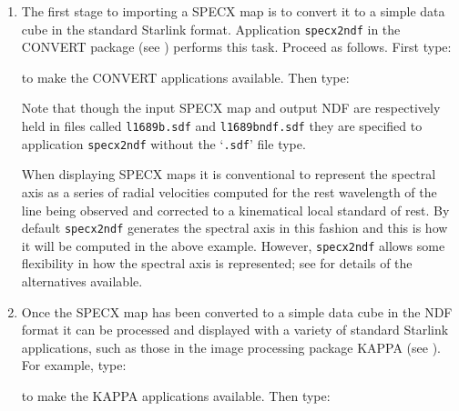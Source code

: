 \documentclass[twoside,11pt]{starlink}
\begin{document}
\begin{enumerate}

  \item The first stage to importing a SPECX map is to convert it to a
   simple data cube in the standard Starlink 
   format.  Application \texttt{specx2ndf} in the CONVERT package
   (see \cite{SUN55}) performs this task.
   Proceed as follows.  First type:

\begin{terminalv}
\end{terminalv}

   to make the CONVERT applications available.  Then type:

\begin{terminalv}
\end{terminalv}

   Note that though the input SPECX map and output NDF are respectively
   held in files called \texttt{l1689b.sdf} and \texttt{l1689bndf.sdf}
   they are specified to application \texttt{specx2ndf} without the `\texttt{.sdf}' file type.

   When displaying SPECX maps it is conventional to represent the
   spectral axis as a series of radial velocities computed for the
   rest wavelength of the line being observed and corrected to a
   kinematical local standard of rest.  By default \texttt{specx2ndf}
   generates the spectral axis in this fashion and this is how it will
   be computed in the above example.  However, \texttt{specx2ndf} allows
   some flexibility in how the spectral axis is represented; see
    for
   details of the alternatives available.

  \item Once the SPECX map has been converted to a simple data cube in
   the NDF format it can be processed and displayed with a variety
   of standard Starlink applications, such as those in the image
   processing package KAPPA (see \cite{SUN95}).
   For example, type:

\begin{terminalv}
\end{terminalv}

   to make the KAPPA applications available.  Then type:

\begin{terminalv}
\end{terminalv}


\end{enumerate}
\end{document}
